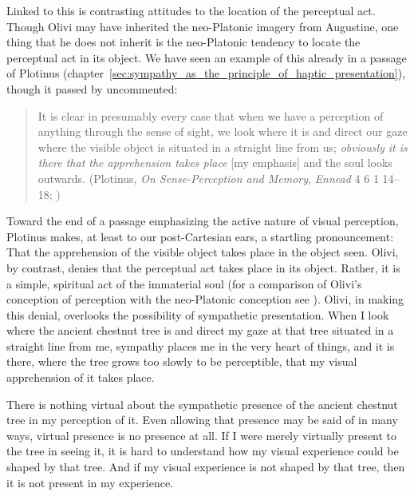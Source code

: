 Linked to this is contrasting attitudes to the location of the perceptual act. Though Olivi may have inherited the neo-Platonic imagery from Augustine, one thing that he does not inherit is the neo-Platonic tendency to locate the perceptual act in its object. We have seen an example of this already in a passage of Plotinus  (chapter~\ref{sec:sympathy_as_the_principle_of_haptic_presentation}), though it passed by uncommented: 
\begin{quote}
	It is clear in presumably every case that when we have a perception of anything through the sense of sight, we look where it is and direct our gaze where the visible object is situated in a straight line from us; \emph{obviously it is there that the apprehension takes place} [my emphasis] and the soul looks outwards. (Plotinus, \emph{On Sense-Perception and Memory}, \emph{Ennead} 4 6 1 14--18; \citealt[321]{Armstrong:1984aa})
\end{quote}
Toward the end of a passage emphasizing the active nature of visual perception, Plotinus makes, at least to our post-Cartesian ears, a startling pronouncement: That the apprehension of the visible object takes place in the object seen. Olivi, by contrast, denies that the perceptual act takes place in its object. Rather, it is a simple, spiritual act of the immaterial soul (for a comparison of Olivi's conception of perception with the neo-Platonic conception see \citealt[151]{Toivanen:2013ul}). Olivi, in making this denial, overlooks the possibility of sympathetic presentation. When I look where the ancient chestnut tree is and direct my gaze at that tree situated in a straight line from me, sympathy places me in the very heart of things, and it is there, where the tree grows too slowly to be perceptible, that my visual apprehension of it takes place.

There is nothing virtual about the sympathetic presence of the ancient chestnut tree in my perception of it. Even allowing that presence may be said of in many ways, virtual presence is no presence at all. If I were merely virtually present to the tree in seeing it, it is hard to understand how my visual experience could be shaped by that tree. And if my visual experience is not shaped by that tree, then it is not present in my experience.

